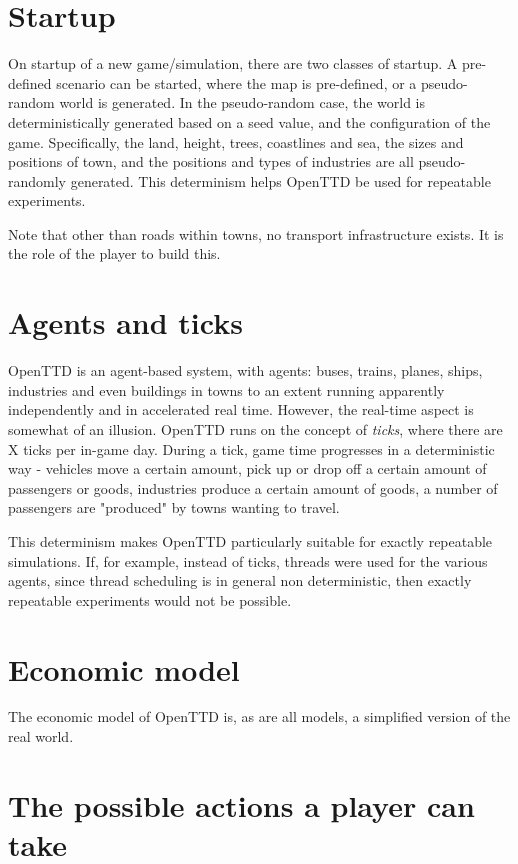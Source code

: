 \documentclass[logo,msc,dsti]{infthesis}    %
\begin{document}
\section{Startup}

On startup of a new game/simulation, there are two classes of startup. A pre-defined scenario can be started, where the map is pre-defined, or a pseudo-random world is generated. In the pseudo-random case, the world is deterministically generated based on a seed value, and the configuration of the game. Specifically, the land, height, trees, coastlines and sea, the sizes and positions of town, and the positions and types of industries are all pseudo-randomly generated. This determinism helps OpenTTD be used for repeatable experiments.

Note that other than roads within towns, no transport infrastructure exists. It is the role of the player to build this.

\section{Agents and ticks}

OpenTTD is an agent-based system, with agents: buses, trains, planes, ships, industries and even buildings in towns to an extent running apparently independently and in accelerated real time. However, the real-time aspect is somewhat of an illusion. OpenTTD runs on the concept of \emph{ticks}, where there are X ticks per in-game day. During a tick, game time progresses in a deterministic way - vehicles move a certain amount, pick up or drop off a certain amount of passengers or goods, industries produce a certain amount of goods, a number of passengers are "produced" by towns wanting to travel.

This determinism makes OpenTTD particularly suitable for exactly repeatable simulations. If, for example, instead of ticks, threads were used for the various agents, since thread scheduling is in general non deterministic, then exactly repeatable experiments would not be possible.

\section{Economic model}

The economic model of OpenTTD is, as are all models, a simplified version of the real world.


\section{The possible actions a player can take}
\end{document}
